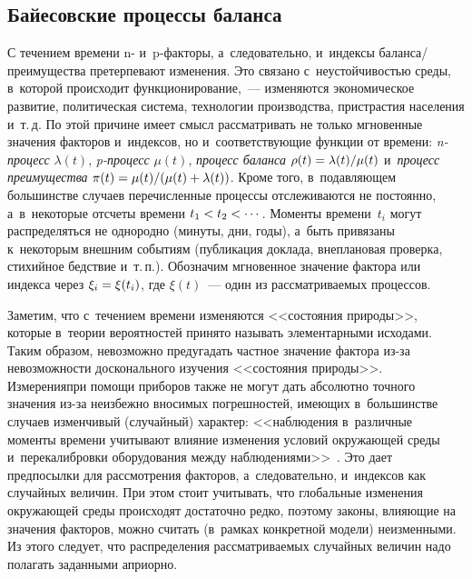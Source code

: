 \begin{multicols}{2}
\vspace*{-12pt}

\section{Байесовские процессы баланса}

\vspace*{-2pt}

С течением времени n- и~p-фак\-то\-ры, а~сле\-довательно, и~индексы ба\-лан\-са/пре\-иму\-щест\-ва 
претер\-пе\-ва\-ют изменения. Это связано с~неустойчивостью среды, в~которой происходит 
функционирование,~--- изменяются экономическое развитие, политическая система, 
технологии производства, пристрастия населения и~т.\,д. По этой причине имеет 
смысл рассматривать не только мгновенные значения факторов и~индексов, 
но и~со\-от\-вет\-ст\-ву\-ющие функции от времени: {\it n-про\-цесс} $\lambda(t)$, 
{\it p-про\-цесс} $\mu(t)$, {\it процесс баланса} $\rho(t)\hm=
\lambda(t)/\mu(t)$ и~{\it процесс преимущества} $\pi(t)\hm=\mu(t)/(\mu(t)\hm+
\lambda(t))$. Кроме того, в~подавляющем большинстве случаев перечисленные 
процессы отслеживаются не постоянно, а~в~некоторые отсчеты времени 
$t_1\hm<t_2<\cdots$. Моменты времени~$t_i$ могут распределяться не однородно 
(минуты, дни, годы), а~быть привязаны к~некоторым внешним событиям 
(пуб\-ли\-ка\-ция доклада, внеплановая проверка, стихийное бедствие и~т.\,п.). 
Обозначим мгновенное значение фактора или индекса через $\xi_i\hm=\xi(t_i)$, 
где $\xi(t)$~--- один из рассматриваемых процессов.

Заметим, что с~течением времени изменяются <<состояния природы>>, которые 
в~тео\-рии вероятностей принято называть элементарными исходами. 
Таким образом, невозможно предугадать частное значение фактора 
из-за невозможности досконального изучения <<состояния природы>>. 
Измерения\linebreak при помощи приборов также не могут дать абсолютно точного 
значения из-за неизбежно вносимых погрешностей, имеющих в~большинстве 
случа\-ев изменчивый (случайный) характер: <<наблюдения в~различные моменты 
времени учитывают влияние изменения условий окружающей среды и~пе\-ре\-ка\-либ\-ров\-ки 
оборудования между наблюдениями>>~\cite{Gost5725}. Это дает предпосылки для 
рассмотрения факторов, а~следовательно, и~индексов как случайных величин. 
При этом стоит учитывать, что глобальные изменения окружающей среды 
происходят достаточно редко, поэтому законы, влияющие на значения факторов, 
можно считать (в~рамках конкретной модели) неизменными. Из этого следует, 
что распределения рассматриваемых случайных величин надо полагать заданными 
априорно.



\end{multicols}
